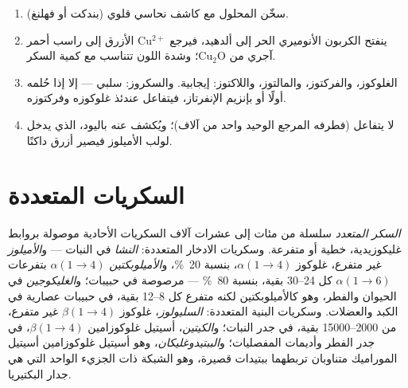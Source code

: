 \begin{method}\label{met:b1:carbohydrates:reducing}
\begin{enumerate}
  \item سخّن المحلول مع كاشف نحاسي قلوي (بندكت أو فهلنغ).
  \item ينفتح الكربون الأنوميري الحر إلى ألدهيد، فيرجع
        $\mathrm{Cu^{2+}}$ الأزرق إلى راسب أحمر آجري من
        $\mathrm{Cu_2O}$؛ وشدة اللون تتناسب مع كمية السكر.
  \item الغلوكوز، والفركتوز، والمالتوز، واللاكتوز: إيجابية.
        والسكروز: سلبي --- إلا إذا حُلمه أولًا  أو بإنزيم
        الإنفرتاز، فيتفاعل عندئذ غلوكوزه وفركتوزه.
  \item {} لا يتفاعل (فطرفه المرجع الوحيد واحد من آلاف)؛ ويُكشف
        عنه باليود، الذي يدخل لولب الأميلوز فيصير أزرق داكنًا.
\end{enumerate}
\end{method}

\section{السكريات المتعددة}

\begin{definition}\label{def:b1:carbohydrates:polysaccharide}
\emph{السكر المتعدد} سلسلة من مئات إلى عشرات آلاف
السكريات الأحادية موصولة بروابط غليكوزيدية، خطية أو متفرعة. وسكريات
الادخار المتعددة: \emph{النشا} في النبات ---
و\emph{الأميلوز} غير متفرع، غلوكوز $\alpha(1{\to}4)$، بنسبة
\qty{20}{\%}، و\emph{الأميلوبكتين} $\alpha(1{\to}4)$ بتفرعات
$\alpha(1{\to}6)$ كل \qtyrange{24}{30}{} بقية، بنسبة \qty{80}{\%} ---
مرصوصة في حبيبات؛ و\emph{الغليكوجين} في الحيوان
والفطر، وهو كالأميلوبكتين لكنه متفرع كل \qtyrange{8}{12}{} بقية، في
حبيبات عصارية في الكبد والعضلات. وسكريات البنية المتعددة:
\emph{السليولوز}، غلوكوز $\beta(1{\to}4)$ غير متفرع،
من \qtyrange{2000}{15000}{} بقية، في جدر النبات؛
و\emph{الكيتين}، أسيتيل غلوكوزامين $\beta(1{\to}4)$، في
جدر الفطر وأديمات المفصليات؛ و\emph{الببتيدوغليكان}،
وهو أسيتيل غلوكوزامين  أسيتيل الموراميك متناوبان تربطهما ببتيدات
قصيرة، وهو الشبكة ذات الجزيء الواحد التي هي جدار البكتيريا.
\end{definition}

